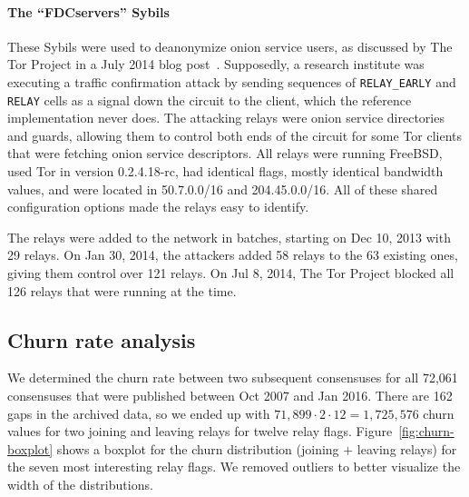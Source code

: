 \paragraph{The ``FDCservers'' Sybils}
These Sybils were used to deanonymize onion service users, as discussed by The
Tor Project in a July 2014 blog post~\cite{cmucert}.  Supposedly, a research
institute was executing a traffic confirmation attack by sending sequences of
\texttt{RELAY\_EARLY} and \texttt{RELAY} cells as a signal down the circuit to
the client, which the reference implementation never does.  The attacking relays
were onion service directories and guards, allowing them to control both ends of
the circuit for some Tor clients that were fetching onion service descriptors.
All relays were running FreeBSD, used Tor in version 0.2.4.18-rc, had identical
flags, mostly identical bandwidth values, and were located in 50.7.0.0/16 and
204.45.0.0/16.  All of these shared configuration options made the relays easy
to identify.

The relays were added to the network in batches, starting on Dec 10, 2013 with
29 relays.  On Jan 30, 2014, the attackers added 58 relays to the 63 existing
ones, giving them control over 121 relays.  On Jul 8, 2014, The Tor Project
blocked all 126 relays that were running at the time.

% 

\subsection{Churn rate analysis}
\label{sec:churn}
We determined the churn rate between two subsequent consensuses for all 72,061
consensuses that were published between Oct 2007 and Jan 2016.  There are 162
gaps in the archived data, so we ended up with $71,899 \cdot 2 \cdot 12 =
1,725,576$ churn values for two joining and leaving relays for twelve relay
flags.  Figure~\ref{fig:churn-boxplot} shows a boxplot for the churn
distribution (joining $+$ leaving relays) for the seven most interesting relay
flags.  We removed outliers to better visualize the width of the distributions.

